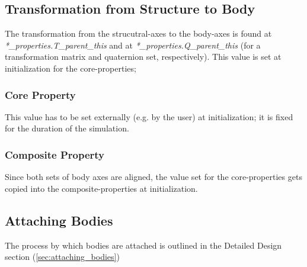 \subsection{Transformation from Structure to Body}
The transformation from the strucutral-axes to the body-axes is found at
\textit{*\_properties.T\_parent\_this} and at
\textit{*\_properties.Q\_parent\_this} (for a transformation matrix and
quaternion set, respectively).  This value is set at initialization for the
core-properties;

\subsubsection {Core Property}
This value has to be set externally (e.g. by the user) at initialization; it
is fixed for the duration of the simulation.
\subsubsection {Composite Property}
Since both sets of body axes are aligned, the value set for the
core-properties gets copied into the composite-properties at initialization.

\subsection{Attaching Bodies}
The process by which bodies are attached is outlined in the Detailed Design
section (\ref{sec:attaching_bodies})








